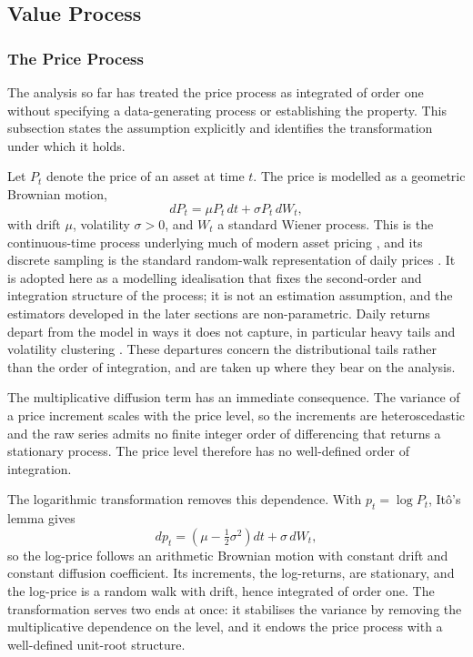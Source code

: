 \documentclass[12pt,a4paper]{article}
\begin{document}
\subsection{Value Process}
\label{sec:value_process}

\subsubsection{The Price Process}
\label{sec:price_process}

The analysis so far has treated the price process as integrated of order
one without specifying a data-generating process or establishing the
property. This subsection states the assumption explicitly and identifies
the transformation under which it holds.

Let $P_t$ denote the price of an asset at time $t$. The price is modelled
as a geometric Brownian motion,
\begin{equation}
    dP_t = \mu P_t \, dt + \sigma P_t \, dW_t,
\end{equation}
with drift $\mu$, volatility $\sigma > 0$, and $W_t$ a standard Wiener
process. This is the continuous-time process underlying much of modern
asset pricing \citep{Osborne1959, Samuelson1965, BlackScholes1973}, and
its discrete sampling is the standard random-walk representation of daily
prices \citep{Fama1965}. It is adopted here as a modelling idealisation
that fixes the second-order and integration structure of the process; it
is not an estimation assumption, and the estimators developed in the later
sections are non-parametric. Daily returns depart from the model in ways
it does not capture, in particular heavy tails and volatility clustering
\citep{Mandelbrot1963, Cont2001}. These departures concern the
distributional tails rather than the order of integration, and are taken
up where they bear on the analysis.

The multiplicative diffusion term has an immediate consequence. The
variance of a price increment scales with the price level, so the
increments are heteroscedastic and the raw series admits no finite integer
order of differencing that returns a stationary process. The price level
therefore has no well-defined order of integration.

The logarithmic transformation removes this dependence. With
$p_t = \log P_t$, Itô's lemma gives
\begin{equation}
    dp_t = \left( \mu - \tfrac{1}{2}\sigma^2 \right) dt + \sigma \, dW_t,
\end{equation}
so the log-price follows an arithmetic Brownian motion with constant drift
and constant diffusion coefficient. Its increments, the log-returns, are
stationary, and the log-price is a random walk with drift, hence
integrated of order one. The transformation serves two ends at once: it
stabilises the variance by removing the multiplicative dependence on the
level, and it endows the price process with a well-defined unit-root
structure.
\end{document}
